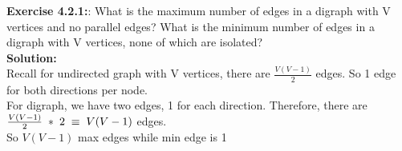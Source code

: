 \documentclass[11pt,fleqn]{article}
\begin{document}
\textbf{Exercise 4.2.1:}: What is the maximum number of edges in a digraph with V vertices and no parallel
edges? What is the minimum number of edges in a digraph with V vertices, none of
which are isolated?\\

\textbf{Solution:}\\
Recall for undirected graph with V vertices, there are $\frac{V(V-1)}{2}$ edges. So 1 edge for both directions per node.\\

For digraph, we have two edges, 1 for each direction. Therefore, there are $\frac{V(V-1)}{2} \thickspace * \thickspace 2 \thickspace \equiv \thickspace V(V-1)$ edges.\\

So $V(V-1)$ max edges while min edge is 1

	
\end{document}
